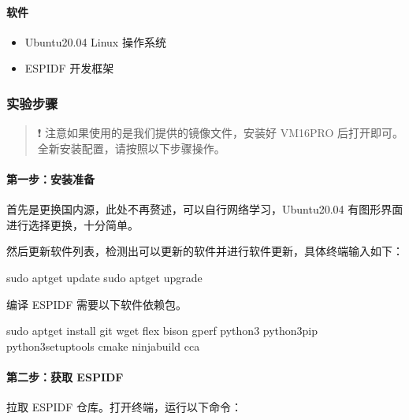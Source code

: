 \documentclass[a4paper,12pt,english]{sphinxmanual}
\begin{document}
\paragraph{软件}
\label{\detokenize{exp-esp32/ide/esp-idf-setup:id9}}\begin{itemize}
\item {} 
\sphinxAtStartPar
Ubuntu20.04 Linux 操作系统

\item {} 
\sphinxAtStartPar
ESP\sphinxhyphen{}IDF 开发框架

\end{itemize}


\subsubsection{实验步骤}
\label{\detokenize{exp-esp32/ide/esp-idf-setup:id10}}\begin{quote}

\sphinxAtStartPar
❗ 注意如果使用的是我们提供的镜像文件，安装好 VM16PRO 后打开即可。全新安装配置，请按照以下步骤操作。
\end{quote}


\paragraph{第一步：安装准备}
\label{\detokenize{exp-esp32/ide/esp-idf-setup:id11}}
\sphinxAtStartPar
首先是更换国内源，此处不再赘述，可以自行网络学习，Ubuntu20.04 有图形界面进行选择更换，十分简单。

\sphinxAtStartPar
然后更新软件列表，检测出可以更新的软件并进行软件更新，具体终端输入如下：

\begin{sphinxVerbatim}[commandchars=\\\{\}]
sudo apt\PYGZhy{}get update
sudo apt\PYGZhy{}get upgrade
\end{sphinxVerbatim}

\sphinxAtStartPar
编译 ESP\sphinxhyphen{}IDF 需要以下软件依赖包。

\begin{sphinxVerbatim}[commandchars=\\\{\}]
sudo apt\PYGZhy{}get install git wget flex bison gperf python3 python3\PYGZhy{}pip python3\PYGZhy{}setuptools cmake ninja\PYGZhy{}build cca
\end{sphinxVerbatim}


\paragraph{第二步：获取 ESP\sphinxhyphen{}IDF}
\label{\detokenize{exp-esp32/ide/esp-idf-setup:id12}}
\sphinxAtStartPar
拉取 ESP\sphinxhyphen{}IDF 仓库。打开终端，运行以下命令：
\end{document}
